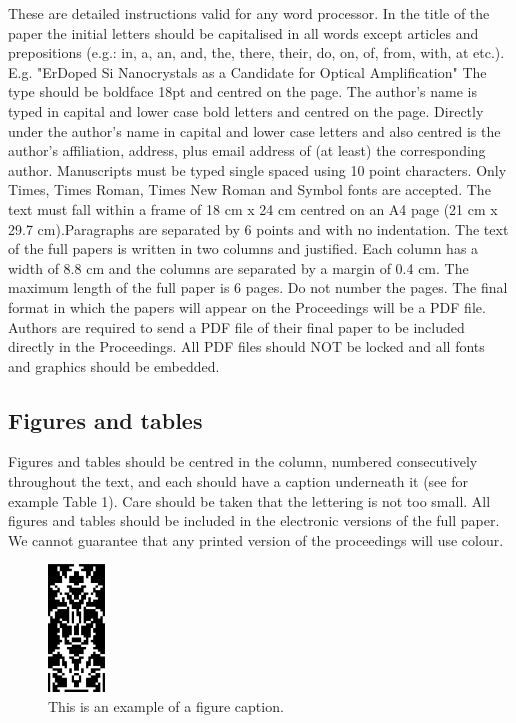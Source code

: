 \documentclass[10pt]{article}
\begin{document}
These are detailed instructions valid for any word
processor. In the title of the paper the initial letters should be
capitalised in all words except articles and prepositions (e.g.:
in, a, an, and, the, there, their, do, on, of, from, with, at etc.).
E.g. "ErDoped Si Nanocrystals as a Candidate for Optical
Amplification" The type should be boldface 18pt and centred
on the page. The author’s name is typed in capital and lower
case bold letters and centred on the page. Directly under the
author’s name in capital and lower case letters and also
centred is the author’s affiliation, address, plus email
address of (at least) the corresponding author. Manuscripts must be
typed single spaced using 10 point characters. Only Times,
Times Roman, Times New Roman and Symbol fonts are
accepted. The text must fall within a frame of 18 cm x 24 cm
centred on an A4 page (21 cm x 29.7 cm).Paragraphs are
separated by 6 points and with no indentation. The text of the
full papers is written in two columns and justified. Each
column has a width of 8.8 cm and the columns are separated
by a margin of 0.4 cm. The maximum length of the full paper
is 6 pages. Do not number the pages. The final format in
which the papers will appear on the Proceedings will be a
PDF file. Authors are required to send a PDF file of their
final paper to be included directly in the Proceedings. All
PDF files should NOT be locked and all fonts and
graphics should be embedded.

\subsection{Figures and tables}
Figures and tables should be centred in the column, numbered
consecutively throughout the text, and each should have a
caption underneath it (see for example Table 1). Care should
be taken that the lettering is not too small. All figures and
tables should be included in the electronic versions of the full
paper. We cannot guarantee that any printed version of the
proceedings will use colour.


\begin{figure}[h]
\centering
\includegraphics[width=1.5cm]{images/fig1}
\caption{\label{tab1}This is an example of a figure caption.} 
\end{figure}
\end{document}
